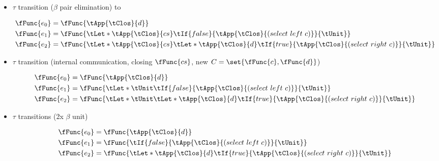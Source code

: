 \begin{itemize}
\begin{small}
\begin{align*}
      \\
      \fFunc{e_2} &=
                    \fFunc{\tLet[\tLVB][d]{\tPair{true}{d}}{\tLet*{\tApp{\tClos}{cs}}{\tLet*{\tApp{\tClos}{d}}{\tIf{\tLVB}{\tApp{\tClos}{(select~right~c)}}{\tUnit}}}}}
    \end{align*}
  \end{small}
\item $\tau$ transition ($\beta$ pair elimination) to
  \begin{small}
    \begin{align*}
      \fFunc{e_0} &=
                    \fFunc{\tApp{\tClos}{d}}
      \\
      \fFunc{e_1} &=
                    \fFunc{{\tLet*{\tApp{\tClos}{cs}}{\tIf{false}{\tApp{\tClos}{(select~left~c)}}{\tUnit}}}}
      \\
      \fFunc{e_2} &=
                    \fFunc{{\tLet*{\tApp{\tClos}{cs}}{\tLet*{\tApp{\tClos}{d}}{\tIf{true}{\tApp{\tClos}{(select~right~c)}}{\tUnit}}}}}
    \end{align*}
  \end{small}
\item $\tau$ transition (internal communication, closing $\fFunc{cs}$,
  new $C = \set{\fFunc{c}, \fFunc{d}}$)
  \begin{small}
    \begin{align*}
      \fFunc{e_0} &=
                    \fFunc{\tApp{\tClos}{d}}
      \\
      \fFunc{e_1} &=
                    \fFunc{{\tLet*{\tUnit}{\tIf{false}{\tApp{\tClos}{(select~left~c)}}{\tUnit}}}}
      \\
      \fFunc{e_2} &=
                    \fFunc{{\tLet*{\tUnit}{\tLet*{\tApp{\tClos}{d}}{\tIf{true}{\tApp{\tClos}{(select~right~c)}}{\tUnit}}}}}
    \end{align*}
  \end{small}
\item $\tau$ transitions (2x $\beta$ unit)
  \begin{small}
    \begin{align*}
      \fFunc{e_0} &=
                    \fFunc{\tApp{\tClos}{d}}
      \\
      \fFunc{e_1} &=
                    \fFunc{{{\tIf{false}{\tApp{\tClos}{(select~left~c)}}{\tUnit}}}}
      \\
      \fFunc{e_2} &=
                    \fFunc{{{\tLet*{\tApp{\tClos}{d}}{\tIf{true}{\tApp{\tClos}{(select~right~c)}}{\tUnit}}}}}
    \end{align*}
  \end{small}

\end{itemize}
